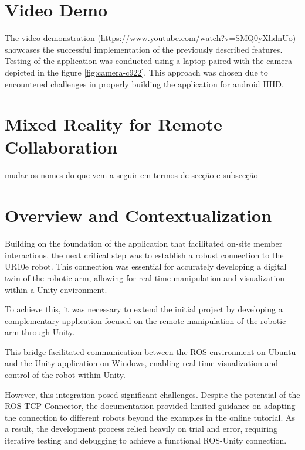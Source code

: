 \section{Video Demo}
    The video demonstration (\href{https://www.youtube.com/watch?v=SMQ0yXhdnUo}{https://www.youtube.com/watch?v=SMQ0yXhdnUo}) showcases 
    the successful implementation of the previously described features. Testing of the application was conducted using a laptop paired
     with the camera depicted in the figure \ref{fig:camera-c922}. This approach was chosen due to encountered challenges in properly
      building the application for android \ac{HHD}.
            

\section{Mixed Reality for Remote Collaboration}
mudar os nomes do que vem a seguir em termos de secção e subsecção


\section{Overview and Contextualization}

    Building on the foundation of the application that facilitated on-site member interactions, the next critical step was to establish a robust connection to the UR10e robot. This connection was essential for accurately developing a digital twin of the robotic arm, allowing for real-time manipulation and visualization within a Unity environment.

    To achieve this, it was necessary to extend the initial project by developing a complementary application focused on the remote manipulation 
    of the robotic arm through Unity. 

    This bridge facilitated communication between the ROS environment on Ubuntu and the Unity application on Windows, enabling real-time visualization 
    and control of the robot within Unity.

    However, this integration posed significant challenges. Despite the potential of the ROS-TCP-Connector, the documentation provided limited guidance 
    on adapting the connection to different robots beyond the examples in the online tutorial. As a result, the development process relied heavily on 
    trial and error, requiring iterative testing and debugging to achieve a functional ROS-Unity connection.

